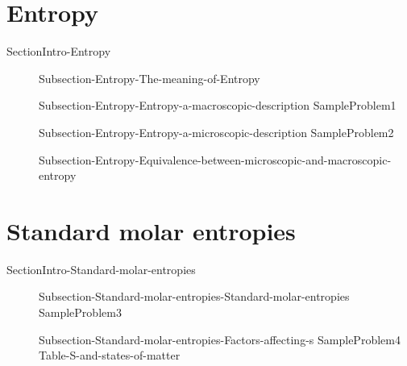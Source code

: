 \documentclass[main.tex]{subfiles}
\newcommand\chapterlabel{Ch-thermo}\setcounter{figurenewcounter}{0}\setcounter{tablenewcounter}{0}\setcounter{formulanewcounter}{0}
\begin{document}
\section{Entropy}
{SectionIntro-Entropy}
\sloppy\begin{description}
\item[]{Subsection-Entropy-The-meaning-of-Entropy}
\item[]{Subsection-Entropy-Entropy-a-macroscopic-description}
{SampleProblem1}
\item[]{Subsection-Entropy-Entropy-a-microscopic-description}
{SampleProblem2}
 \item[]{Subsection-Entropy-Equivalence-between-microscopic-and-macroscopic-entropy}

\end{description}

\section{Standard molar entropies}
{SectionIntro-Standard-molar-entropies}
\sloppy\begin{description}
\item[]{Subsection-Standard-molar-entropies-Standard-molar-entropies}
{SampleProblem3}
\item[]{Subsection-Standard-molar-entropies-Factors-affecting-s}
    {SampleProblem4}
    {Table-S-and-states-of-matter}
\end{description}
 
  
\end{document}
